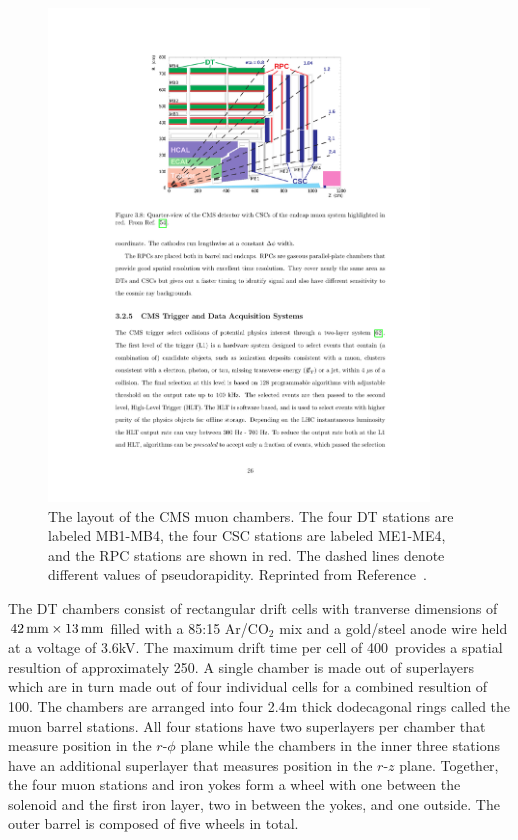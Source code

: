\begin{figure}[htbp]
  \centering
  \includegraphics[width=0.9\textwidth]{Detector/Figures/cms_muons.pdf}
  \caption{
    The layout of the CMS muon chambers.
    The four DT stations are labeled MB1-MB4, the four CSC stations are labeled ME1-ME4, and the RPC stations are shown in red.
    The dashed lines denote different values of pseudorapidity.
    Reprinted from Reference~\cite{CMS2008}.
  }
  \label{fig:cms_muons}
\end{figure}

The DT chambers consist of rectangular drift cells with tranverse dimensions of $42\,\text{mm} \times 13\,\text{mm}$ filled with a 85:15 Ar/CO$_2$ mix and a gold/steel anode wire held at a voltage of 3.6\unit{kV}.
The  maximum drift time per cell of 400\ns\ provides a spatial resultion of approximately 250\mum.
A single chamber is made out of superlayers which are in turn made out of four individual cells for a combined resultion of 100\mum.
The chambers are arranged into four 2.4\unit{m} thick dodecagonal rings called the muon barrel stations.
All four stations have two superlayers per chamber that measure position in the $r$-$\phi$ plane while the chambers in the inner three stations have an additional superlayer that measures position in the $r$-$z$ plane.
Together, the four muon stations and iron yokes form a wheel with one between the solenoid and the first iron layer, two in between the yokes, and one outside.
The outer barrel is composed of five wheels in total. 

